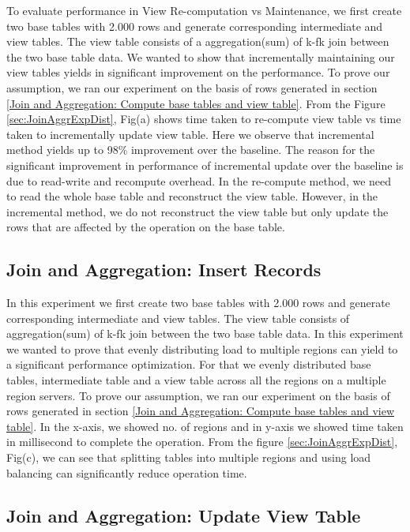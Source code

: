 \documentclass[11pt,a4paper,bibtotoc,idxtotoc,headsepline,footsepline,footexclude,BCOR12mm,DIV13]{scrbook}
\begin{document}
To evaluate performance in View Re-computation vs Maintenance, we first create two base tables with 2.000 rows and generate corresponding intermediate and view tables. The view table consists of a aggregation(sum) of k-fk join between the two base table data. We wanted to show that incrementally maintaining our view tables yields in significant improvement on the performance. To prove our assumption, we ran our experiment on the basis of rows generated in section \ref{Join and Aggregation: Compute base tables and view table}. From the Figure \ref{sec:JoinAggrExpDist}, Fig(a) shows time taken to re-compute view table vs time taken to incrementally update view table. Here we observe that incremental method yields up to 98\% improvement over the baseline. The reason for the significant improvement in performance of incremental update over the baseline is due to read-write and recompute overhead. In the re-compute method, we need to read the whole base table and
reconstruct the view table. However, in the incremental method, we do not reconstruct the view table but only update the rows that are affected by the operation on the base table. 


\subsection{Join and Aggregation: Insert Records}
\label{Join and Aggregation: Insert Records Distributed}
In this experiment we first create two base tables with 2.000 rows and generate corresponding intermediate and view tables. The view table consists of aggregation(sum) of k-fk join between the two base table data. In this experiment we wanted to prove that evenly distributing load to multiple regions can yield to a significant performance optimization. For that we evenly distributed base tables, intermediate table and a view table across all the regions on a multiple region servers.  
To prove our assumption, we ran our experiment on the basis of rows generated in section \ref{Join and Aggregation: Compute base tables and view table}. In the x-axis, we showed no. of regions and in y-axis we showed time taken in millisecond to complete the operation. From the figure \ref{sec:JoinAggrExpDist}, Fig(c), we can see that splitting tables into multiple regions and using load balancing can significantly reduce operation time.

\subsection{Join and Aggregation: Update View Table} 
\label{Join and Aggr: Update View Table Distributed}
\end{document}
